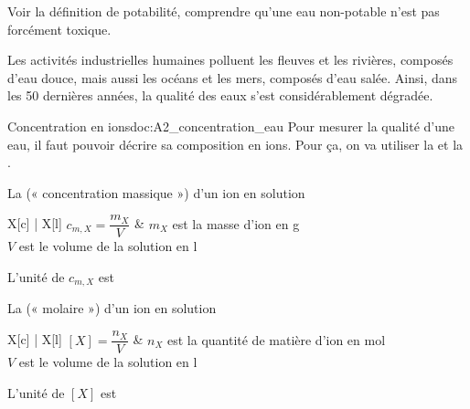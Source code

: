 \teteTermStssEnvi
\vspace*{-36pt}


\begin{objectifs}
  \item Voir la définition de potabilité, comprendre qu'une eau non-potable n'est pas forcément toxique.
\end{objectifs}

\begin{contexte}
  Les activités industrielles humaines polluent les fleuves et les rivières, composés d'eau douce, mais aussi les océans et les mers, composés d'eau salée.
  Ainsi, dans les 50 dernières années, la qualité des eaux s'est considérablement dégradée.
  
\end{contexte}


\begin{doc}{Concentration en ions}{doc:A2_concentration_eau}
  Pour mesurer la qualité d'une eau, il faut pouvoir décrire sa composition en ions.
  Pour ça, on va utiliser la 
  et la .

  \begin{importants}  
    La  (« concentration massique ») d'un ion en solution
    \begin{center}
      \begin{tblr}{X[c] | X[l]}
        $c_{m,X} = \dfrac{m_X}{V}$ &
        { $m_X$ est la masse d'ion en \unit{\g} \\
        $V$ est le volume de la solution en \unit{\litre} }
      \end{tblr}
    \end{center}
    L'unité de $c_{m,X}$ est \texteTrou[0.1]{\unit{\g\per\litre}}
  \end{importants}
  \begin{importants}  
    La  (« molaire ») d'un ion en solution
    \begin{center}
      \begin{tblr}{X[c] | X[l]}
        $[X] = \dfrac{n_X}{V}$ &
        { $n_X$ est la quantité de matière d'ion en \unit{\mole} \\
        $V$ est le volume de la solution en \unit{\litre} }
      \end{tblr}
    \end{center}
    L'unité de $[X]$ est \texteTrou[0.1]{\unit{\mole\per\litre}}
  \end{importants}
\end{doc}

